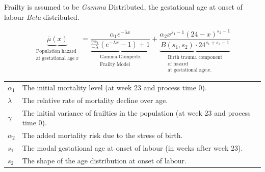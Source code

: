 \documentclass{beamer}
\begin{document}
\begin{frame}
\frametitle{\insertsection}

Frailty is assumed to be \emph{Gamma} Distributed, the gestational age at onset of labour \emph{Beta} distributed.

\begin{equation*}
  \underbrace{
    \overline{\mu}(x)
  }_{\substack{
    \text{Population hazard}\\ \text{at gestational age}~x
  }} =
  \underbrace{
    \frac {\alpha_1 e^{-\lambda x}} {\frac{\gamma \alpha_1} {-\lambda} (e^{-\lambda x} - 1) + 1}
  }_{\substack{
    \text{Gamma-Gompertz}\\ \text{Frailty Model}
  }} +
  \underbrace{
    \frac{\alpha_2 x^{s_1-1} (24-x)^{s_2-1}} {B(s_1,s_2) \cdot 24^{s_1+s_2-1}}
  }_{\substack{
    \text{Birth trauma component}\\ \text{of hazard}\\ \text{at gestational age}~x.
  }}
\end{equation*}

\small\centering
\begin{tabular}{p{1cm}p{7cm}}
  $\alpha_1$ & The initial mortality level (at week 23 and process time 0). \\
  $\lambda$ & The relative rate of mortality decline over age. \\
  $\gamma$ & The initial variance of frailties in the population (at week 23 and process time 0).\\
  $\alpha_2$ & The added mortality risk due to the stress of birth. \\
  $s_1$ & The modal gestational age at onset of labour (in weeks after week 23). \\
  $s_2$ & The shape of the age distribution at onset of labour. \\
\end{tabular}

\end{frame}

\end{document}
